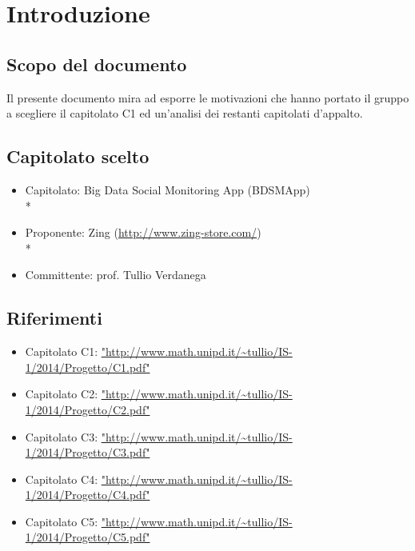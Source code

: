 %


\section{Introduzione}

\subsection{Scopo del documento}
Il presente documento mira ad esporre le motivazioni che hanno portato il gruppo a scegliere il capitolato C1 ed un'analisi dei restanti capitolati d'appalto.

\subsection{Capitolato scelto}
\begin{itemize}
\item Capitolato: Big Data Social Monitoring App (BDSMApp)\\*
\item Proponente: Zing (\url{http://www.zing-store.com/})\\*
\item Committente: prof. Tullio Verdanega
\end{itemize}

\subsection{Riferimenti}
\begin{itemize}
\item Capitolato C1: \url{"http://www.math.unipd.it/~tullio/IS-1/2014/Progetto/C1.pdf"}
\item Capitolato C2: \url{"http://www.math.unipd.it/~tullio/IS-1/2014/Progetto/C2.pdf"}
\item Capitolato C3: \url{"http://www.math.unipd.it/~tullio/IS-1/2014/Progetto/C3.pdf"}
\item Capitolato C4: \url{"http://www.math.unipd.it/~tullio/IS-1/2014/Progetto/C4.pdf"}
\item Capitolato C5: \url{"http://www.math.unipd.it/~tullio/IS-1/2014/Progetto/C5.pdf"}
\end{itemize}